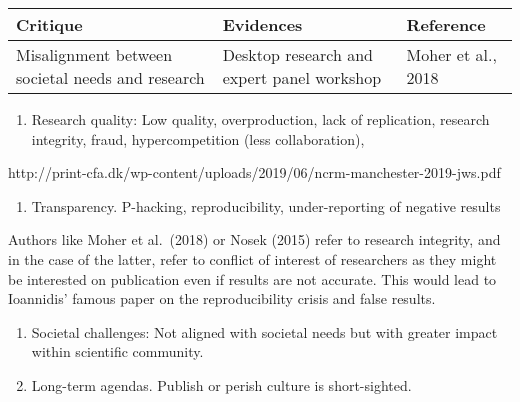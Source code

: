 \documentclass[]{elsarticle} %
\providecommand{\tightlist}{%
  \setlength{\itemsep}{0pt}\setlength{\parskip}{0pt}}
\begin{document}
\begin{longtable}[]{@{}lll@{}}
\toprule
\begin{minipage}[b]{0.29\columnwidth}\raggedright
Critique\strut
\end{minipage} & \begin{minipage}[b]{0.32\columnwidth}\raggedright
Evidences\strut
\end{minipage} & \begin{minipage}[b]{0.29\columnwidth}\raggedright
Reference\strut
\end{minipage}\tabularnewline
\midrule
\endhead
\begin{minipage}[t]{0.29\columnwidth}\raggedright
Misalignment between societal needs and research\strut
\end{minipage} & \begin{minipage}[t]{0.32\columnwidth}\raggedright
Desktop research and expert panel workshop\strut
\end{minipage} & \begin{minipage}[t]{0.29\columnwidth}\raggedright
Moher et al., 2018\strut
\end{minipage}\tabularnewline
\bottomrule
\end{longtable}

\begin{enumerate}
\def\labelenumi{\arabic{enumi}.}
\tightlist
\item
  Research quality: Low quality, overproduction, lack of replication,
  research integrity, fraud, hypercompetition (less collaboration),
\end{enumerate}

http://print-cfa.dk/wp-content/uploads/2019/06/ncrm-manchester-2019-jws.pdf

\begin{enumerate}
\def\labelenumi{\arabic{enumi}.}
\setcounter{enumi}{1}
\tightlist
\item
  Transparency. P-hacking, reproducibility, under-reporting of negative
  results
\end{enumerate}

Authors like Moher et al.~(2018) or Nosek (2015) refer to research
integrity, and in the case of the latter, refer to conflict of interest
of researchers as they might be interested on publication even if
results are not accurate. This would lead to Ioannidis' famous paper on
the reproducibility crisis and false results.

\begin{enumerate}
\def\labelenumi{\arabic{enumi}.}
\setcounter{enumi}{2}
\item
  Societal challenges: Not aligned with societal needs but with greater
  impact within scientific community.
\item
  Long-term agendas. Publish or perish culture is short-sighted.
\end{enumerate}
\end{document}
